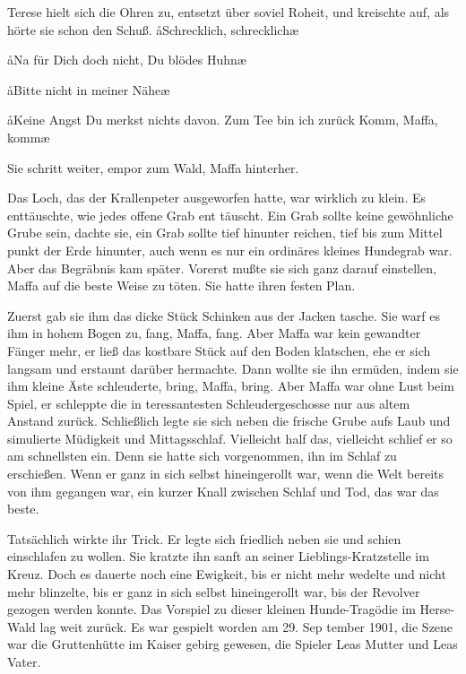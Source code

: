Terese hielt sich die Ohren zu, entsetzt über soviel Roheit, und
kreischte auf, als hörte sie schon den Schuß. \aa Schrecklich,
schrecklich\ausr\ae

\aa Na für Dich doch nicht, Du blödes Huhn\ausr\ae

\aa Bitte nicht in meiner Nähe\ausr\ae

\aa Keine Angst\ausr{} Du merkst nichts davon. Zum Tee bin ich
zurück\punkte{} Komm, Maffa, komm\ausr\ae

Sie schritt weiter, empor zum Wald, Maffa hinterher.

Das Loch, das der Krallenpeter ausgeworfen hatte, war
wirklich zu klein. Es enttäuschte, wie jedes offene Grab ent\-%
täuscht. Ein Grab sollte keine gewöhnliche Grube sein, dachte
sie, ein Grab sollte tief hinunter reichen, tief bis zum Mittel\-%
punkt der Erde hinunter, auch wenn es nur ein ordinäres
kleines Hundegrab war. Aber das Begräbnis kam später.
Vorerst mußte sie sich ganz darauf einstellen, Maffa auf die
beste Weise zu töten. Sie hatte ihren festen Plan.

Zuerst gab sie ihm das dicke Stück Schinken aus der Jacken\-%
tasche. Sie warf es ihm in hohem Bogen zu, fang, Maffa,
fang. Aber Maffa war kein gewandter Fänger mehr, er ließ
das kostbare Stück auf den Boden klatschen, ehe er sich langsam
und erstaunt darüber hermachte. Dann wollte sie ihn ermüden,
indem sie ihm kleine Äste schleuderte, bring, Maffa, bring.
Aber Maffa war ohne Lust beim Spiel, er schleppte die in\-%
teressantesten Schleudergeschosse nur aus altem Anstand
zurück. Schließlich legte sie sich neben die frische Grube aufs
Laub und simulierte Müdigkeit und Mittagsschlaf. Vielleicht
half das, vielleicht schlief er so am schnellsten ein. Denn sie
hatte sich vorgenommen, ihn im Schlaf zu erschießen. Wenn
er ganz in sich selbst hineingerollt war, wenn die Welt bereits
von ihm gegangen war, ein kurzer Knall zwischen Schlaf und
Tod, das war das beste.

Tatsächlich wirkte ihr Trick. Er legte sich friedlich neben sie
und schien einschlafen zu wollen. Sie kratzte ihn sanft an seiner
Lieblings-Kratzstelle im Kreuz. Doch es dauerte noch eine
Ewigkeit, bis er nicht mehr wedelte und nicht mehr blinzelte,
bis er ganz in sich selbst hineingerollt war, bis der Revolver
gezogen werden konnte.
\abstand
Das Vorspiel zu dieser kleinen Hunde-Tragödie im Herse-%
Wald lag weit zurück. Es war gespielt worden am 29. Sep\-%
tember 1901, die Szene war die Gruttenhütte im Kaiser\-%
gebirg gewesen, die Spieler Leas Mutter und Leas Vater.

